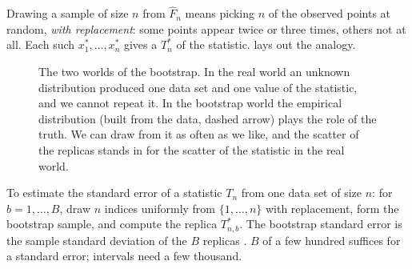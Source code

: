 Drawing a sample of size $n$ from $\hat F_n$ means picking $n$ of the
observed points at random, \emph{with replacement}: some points appear
twice or three times, others not at all. Each such  $x^*_1,\dots,x^*_n$ gives a  $T^*_n$ of the
statistic.  lays out the analogy.

\begin{figure}[htbp]
\centering
{}
\caption{The two worlds of the bootstrap. In the real world an unknown
distribution produced one data set and one value of the statistic, and
we cannot repeat it. In the bootstrap world the empirical distribution
(built from the data, dashed arrow) plays the role of the truth. We can
draw from it as often as we like, and the scatter of the replicas stands in
for the scatter of the statistic in the real world.}
\label{3b:fig:two-worlds}
\end{figure}

\begin{workdef}
To estimate the standard error of a statistic $T_n$ from one data set of
size $n$: for $b=1,\dots,B$, draw $n$ indices uniformly from
$\{1,\dots,n\}$ with replacement, form the bootstrap sample, and compute the
replica $T^*_{n,b}$. The bootstrap standard error is the sample standard
deviation of the $B$ replicas . $B$ of a few hundred
suffices for a standard error; intervals need a few thousand.
\end{workdef}

